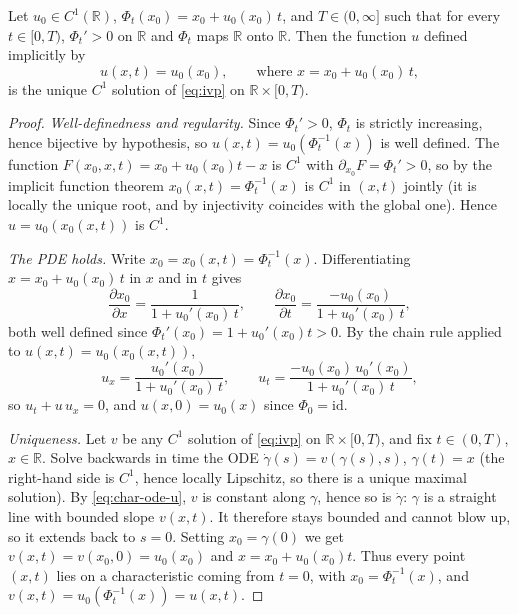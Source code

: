 \begin{theorem}
\label{thm:implicit-solution}
Let $u_0 \in C^1(\mathbb{R})$, $\Phi_t(x_0) = x_0 + u_0(x_0)\, t$, and
$T\in(0,\infty]$ such that for every $t\in[0,T)$, $\Phi_t'>0$ on $\mathbb{R}$
and $\Phi_t$ maps $\mathbb{R}$ onto $\mathbb{R}$. Then the function $u$ defined
implicitly by
\begin{equation}
  \label{eq:implicit-solution}
  u(x,t) = u_0(x_0), \qquad \text{where } x = x_0 + u_0(x_0)\, t,
\end{equation}
is the unique $C^1$ solution of \eqref{eq:ivp} on $\mathbb{R}\times[0,T)$.
\end{theorem}

\begin{proof}
\emph{Well-definedness and regularity.} Since $\Phi_t'>0$, $\Phi_t$ is
strictly increasing, hence bijective by hypothesis, so $u(x,t) =
u_0(\Phi_t^{-1}(x))$ is well defined. The function
$F(x_0,x,t)=x_0+u_0(x_0)t-x$ is $C^1$ with $\partial_{x_0}F=\Phi_t'>0$, so by
the implicit function theorem $x_0(x,t)=\Phi_t^{-1}(x)$ is $C^1$ in $(x,t)$
jointly (it is locally the unique root, and by injectivity coincides with the
global one). Hence $u=u_0(x_0(x,t))$ is $C^1$.

\emph{The PDE holds.} Write $x_0 = x_0(x,t) = \Phi_t^{-1}(x)$.
Differentiating $x = x_0 + u_0(x_0)\, t$ in $x$ and in $t$ gives
\begin{equation}
  \frac{\partial x_0}{\partial x} = \frac{1}{1 + u_0'(x_0)\,t},
  \qquad
  \frac{\partial x_0}{\partial t} = \frac{-u_0(x_0)}{1 + u_0'(x_0)\, t},
\end{equation}
both well defined since $\Phi_t'(x_0) = 1+u_0'(x_0)t > 0$. By the chain
rule applied to $u(x,t) = u_0(x_0(x,t))$,
\begin{equation}
  u_x = \frac{u_0'(x_0)}{1 + u_0'(x_0)\,t},
  \qquad
  u_t = \frac{-u_0(x_0)\, u_0'(x_0)}{1 + u_0'(x_0)\, t},
\end{equation}
so $u_t + u\,u_x = 0$, and $u(x,0)=u_0(x)$ since $\Phi_0=\mathrm{id}$.

\emph{Uniqueness.} Let $v$ be any $C^1$ solution of \eqref{eq:ivp} on
$\mathbb{R}\times[0,T)$, and fix $t\in(0,T)$, $x\in\mathbb{R}$. Solve backwards in time
the ODE $\dot\gamma(s)=v(\gamma(s),s)$, $\gamma(t)=x$ (the right-hand side is $C^1$,
hence locally Lipschitz, so there is a unique maximal solution). By
\eqref{eq:char-ode-u}, $v$ is constant along $\gamma$, hence so is $\dot\gamma$:
$\gamma$ is a straight line with bounded slope $v(x,t)$. It therefore stays
bounded and cannot blow up, so it extends back to $s=0$. Setting
$x_0=\gamma(0)$ we get $v(x,t)=v(x_0,0)=u_0(x_0)$ and $x=x_0+u_0(x_0)t$.
Thus every point $(x,t)$ lies on a characteristic coming from $t=0$, with
$x_0=\Phi_t^{-1}(x)$, and $v(x,t)=u_0(\Phi_t^{-1}(x))=u(x,t)$.
\end{proof}

